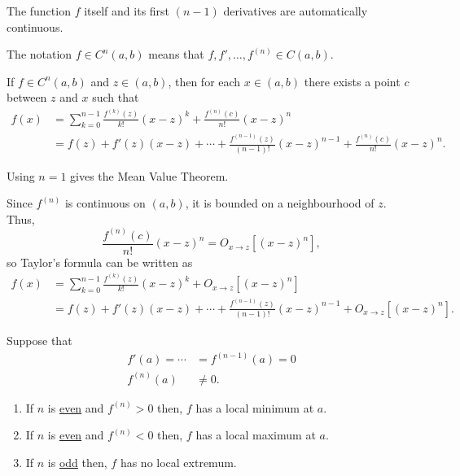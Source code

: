 \documentclass[12pt, a4paper]{article}
\begin{document}
\begin{mdnote}
    The function \(f\) itself and its first \((n-1)\) derivatives are automatically continuous.
\end{mdnote}

\begin{mdremark}
    The notation \(f\in C^n(a,b)\) means that \(f,f',\ldots, f^{(n)} \in C(a,b)\).
\end{mdremark}

\begin{theorem}
    If \(f\in C^n(a,b)\) and \(z \in (a,b)\), then for each \(x \in (a,b)\) there exists a point \(c\) between \(z\) and \(x\) such that 
    \[\begin{aligned}
        f(x) &= \sum_{k=0}^{n-1} \frac{f^{(k)}(z)}{k!}(x-z)^k + \frac{f^{(n)}(c)}{n!}(x-z)^n \\
        &= f(z)+ f'(z)(x-z)+\cdots + \frac{f^{(n-1)}(z)}{(n-1)!}(x-z)^{n-1} + \frac{f^{(n)}(c)}{n!}(x-z)^n.
    \end{aligned}\]
\end{theorem}

\begin{mdremark}
    Using \(n=1\) gives the Mean Value Theorem.
\end{mdremark}

\begin{mdthm}
    Since \(f^{(n)}\) is continuous on \((a,b)\), it is bounded on a neighbourhood of \(z\). Thus, 
    \[\frac{f^{(n)}(c)}{n!}(x-z)^n = O_{x\to z}[(x-z)^n],\]
    so Taylor's formula can be written as 
    \[\begin{aligned}
        f(x) &= \sum_{k=0}^{n-1} \frac{f^{(k)}(z)}{k!}(x-z)^k +  O_{x\to z}[(x-z)^n] \\
        &=f(z)+ f'(z)(x-z)+\cdots + \frac{f^{(n-1)}(z)}{(n-1)!}(x-z)^{n-1} + O_{x\to z}[(x-z)^n].
    \end{aligned}\]
\end{mdthm}

\begin{mdthm}
    Suppose that
    \[\begin{aligned}
        f'(a) = \cdots &= f^{(n-1)}(a) =0 \\
        f^{(n)}(a)&\neq 0.
    \end{aligned}\]
    \begin{enumerate}
        \item If \(n\) is \underline{even} and \(f^{(n)}>0\) then, \(f\) has a local minimum at \(a\).
        \item If \(n\) is \underline{even} and \(f^{(n)}<0\) then, \(f\) has a local maximum at \(a\).
        \item If \(n\) is \underline{odd} then, \(f\) has no local extremum.
    \end{enumerate}
\end{mdthm}
\end{document}
